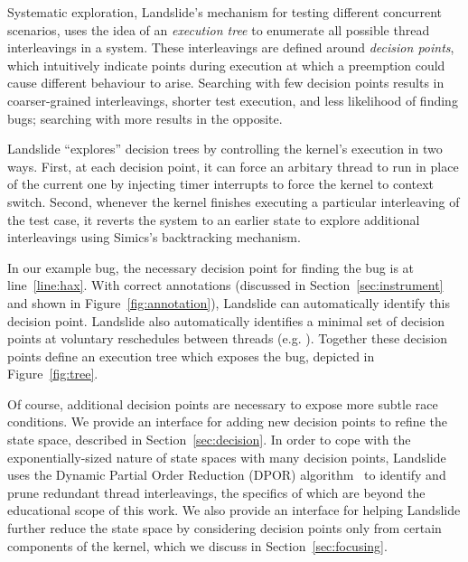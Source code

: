 Systematic exploration, Landslide's mechanism for testing different concurrent scenarios, uses the idea of an {\em execution tree} to enumerate all possible thread interleavings in a system. These interleavings are defined around {\em decision points}, which intuitively indicate points during execution at which a preemption could cause different behaviour to arise.
Searching with few decision points results in coarser-grained interleavings, shorter test execution, and less likelihood of finding bugs; searching with more results in the opposite.

Landslide ``explores'' decision trees by controlling the kernel's execution in two ways.
First, at each decision point, it can force an arbitary thread to run in place of the current one by injecting timer interrupts to force the kernel to context switch.
Second, whenever the kernel finishes executing a particular interleaving of the test case, it reverts the system to an earlier state to explore additional interleavings using Simics's backtracking mechanism.

In our example bug, the necessary decision point for finding the bug is at line~\ref{line:hax}. With correct annotations (discussed in Section~\ref{sec:instrument} and shown in Figure~\ref{fig:annotation}), Landslide can automatically identify this decision point.
Landslide also automatically identifies a minimal set of decision points at voluntary reschedules between threads (e.g. ). Together these decision points define an execution tree which exposes the bug, depicted in Figure~\ref{fig:tree}.

Of course, additional decision points are necessary to expose more subtle race conditions. We provide an interface for adding new decision points to refine the state space, described in Section~\ref{sec:decision}.
In order to cope with the exponentially-sized nature of state spaces with many decision points, Landslide uses the Dynamic Partial Order Reduction (DPOR) algorithm~\cite{dpor} to identify and prune redundant thread interleavings, the specifics of which are beyond the educational scope of this work.
We also provide an interface for helping Landslide further reduce the state space by considering decision points only from certain components of the kernel, which we discuss in Section~\ref{sec:focusing}.

